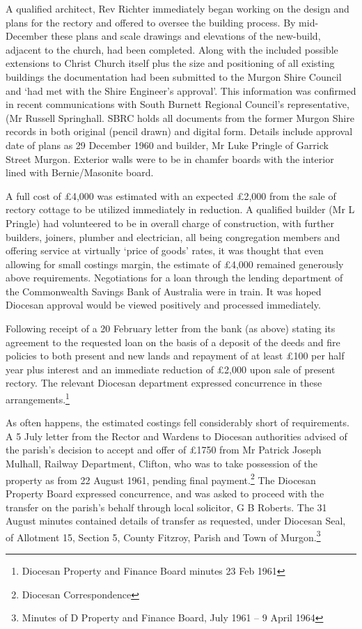 A qualified architect, Rev Richter immediately began working on the design and plans for the rectory and offered to oversee the building process. By mid-December these plans and scale drawings and elevations of the new-build, adjacent to the church, had been completed. Along with the included possible extensions to Christ Church itself plus the size and positioning of all existing buildings the documentation had been submitted to the Murgon Shire Council and `had met with the Shire Engineer's approval'. This information was confirmed in recent communications with South Burnett Regional Council's representative, (Mr Russell Springhall. SBRC holds all documents from the former Murgon Shire records in both original (pencil drawn) and digital form. Details include approval date of plans as 29 December 1960 and builder, Mr Luke Pringle of Garrick Street Murgon. Exterior walls were to be in chamfer boards with the interior lined with Bernie/Masonite board.



A full cost of \pounds4,000 was estimated with an expected \pounds2,000 from the sale of rectory cottage to be utilized immediately in reduction. A qualified builder (Mr L Pringle) had volunteered to be in overall charge of construction, with further builders, joiners, plumber and electrician, all being congregation members and offering service at virtually `price of goods' rates, it was thought that even allowing for small costings margin, the estimate of \pounds4,000 remained generously above requirements. Negotiations for a loan through the lending department of the Commonwealth Savings Bank of Australia were in train. It was hoped Diocesan approval would be viewed positively and processed immediately.



Following receipt of a 20 February letter from the bank (as above) stating its agreement to the requested loan on the basis of a deposit of the deeds and fire policies to both present and new lands and repayment of at least \pounds100 per half year plus interest and an immediate reduction of \pounds2,000 upon sale of present rectory. The relevant Diocesan department expressed concurrence in these arrangements.\footnote{Diocesan Property and Finance Board minutes 23 Feb 1961}


As often happens, the estimated costings fell considerably short of requirements. A 5 July letter from the Rector and Wardens to Diocesan authorities advised of the parish's decision to accept and offer of \pounds1750 from Mr Patrick Joseph Mulhall, Railway Department, Clifton, who was to take possession of the property as from 22 August 1961, pending final payment.\footnote{Diocesan Correspondence} The Diocesan Property Board expressed concurrence, and was asked to proceed with the transfer on the parish's behalf through local solicitor, G B Roberts. The 31 August minutes contained details of transfer as requested, under Diocesan Seal, of Allotment 15, Section 5, County Fitzroy, Parish and Town of Murgon.\footnote{Minutes of D Property and Finance Board, July 1961 -- 9 April 1964}


